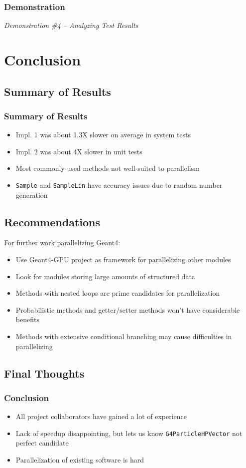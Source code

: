 \documentclass{beamer}
\begin{document}
\begin{frame}
\frametitle{Demonstration}
\begin{center}
\emph{Demonstration  \#4 -- Analyzing Test Results}
\end{center}
\end{frame}

\section{Conclusion}
\subsection{Summary of Results}
\begin{frame}
\frametitle{Summary of Results}
\begin{itemize}
\item Impl. 1 was about 1.3X slower on average in system tests
\item Impl. 2 was about 4X slower in unit tests
\item Most commonly-used methods not well-suited to parallelism
\item \texttt{Sample} and \texttt{SampleLin} have accuracy issues due to random number generation
\end{itemize}
\end{frame}

\subsection{Recommendations}
\begin{frame}
For further work parallelizing Geant4:
\begin{itemize}
\item Use Geant4-GPU project as framework for parallelizing other modules
\item Look for modules storing large amounts of structured data
\item Methods with nested loops are prime candidates for parallelization
\item Probabilistic methods and getter/setter methods won't have considerable benefits
\item Methods with extensive conditional branching may cause difficulties in parallelizing
\end{itemize}
\end{frame}

\subsection{Final Thoughts}
\begin{frame}
\frametitle{Conclusion}
\begin{itemize}
\item All project collaborators have gained a lot of experience
\item Lack of speedup disappointing, but lets us know \texttt{G4ParticleHPVector} not perfect candidate
\item Parallelization of existing software is hard
\end{itemize}
\end{frame}
\end{document}
